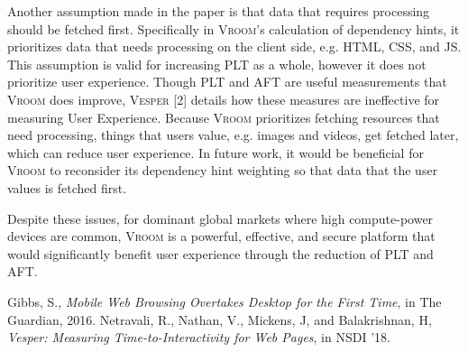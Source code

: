 \documentclass[10pt,letterpaper]{article}
\begin{document}
\begin{multicols*}{2}[]
                Another assumption made in the paper is that data that requires processing should be fetched first. Specifically in \textsc{Vroom}'s calculation of dependency hints, it prioritizes data that needs processing on the client side, e.g. HTML, CSS, and JS. This assumption is valid for increasing PLT as a whole, however it does not prioritize user experience. Though PLT and AFT are useful measurements that \textsc{Vroom} does improve, \textsc{Vesper} [2] details how these measures are ineffective for measuring User Experience. Because \textsc{Vroom} prioritizes fetching resources that need processing, things that users value, e.g. images and videos, get fetched later, which can reduce user experience. In future work, it would be beneficial for \textsc{Vroom} to reconsider its dependency hint weighting so that data that the user values is fetched first. 

			    Despite these issues, for dominant global markets where high compute-power devices are common, \textsc{Vroom} is a powerful, effective, and secure platform that would significantly benefit user experience through the reduction of PLT and AFT.

                \begin{thebibliography}{999}
                    Gibbs, S.,
                    \emph{Mobile Web Browsing Overtakes Desktop for the First Time},
                    in The Guardian, 2016.
                    Netravali, R., Nathan, V., Mickens, J, and Balakrishnan, H,
                    \emph{Vesper: Measuring Time-to-Interactivity for Web Pages},
                    in NSDI '18.
                \end{thebibliography}
\end{multicols*}
\end{document}
